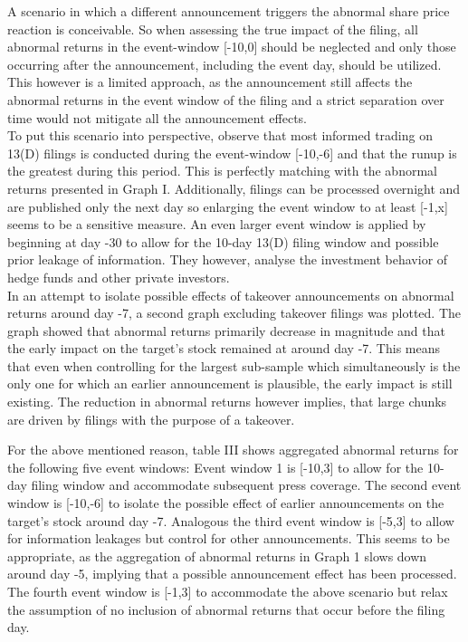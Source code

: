 \documentclass[12pt]{article}
\begin{document}
A scenario in which a different announcement triggers the abnormal share price reaction is conceivable. So when assessing the true impact of the filing, all abnormal returns in the event-window [-10,0] should be neglected and only those occurring after the announcement, including the event day, should be utilized. This however is a limited approach, as the announcement still affects the abnormal returns in the event window of the filing and a strict separation over time would not mitigate all the announcement effects.\\
To put this scenario into perspective, \citet[p.32]{Brigida2012} observe that most informed trading on 13(D) filings is conducted during the event-window [-10,-6] and that the runup is the greatest during this period. This is perfectly matching with the abnormal returns presented in Graph I. Additionally, filings can be processed overnight and are published only the next day so enlarging the event window to at least [-1,x] seems to be a sensitive measure. An even larger event window is applied by \citet[207]{Klein2009} beginning at day -30 to allow for the 10-day 13(D) filing window and possible prior leakage of information. They however, analyse the investment behavior of hedge funds and other private investors. \\
In an attempt to isolate possible effects of takeover announcements on abnormal returns around day -7, a second graph excluding takeover filings was plotted. The graph showed that abnormal returns primarily decrease in magnitude and that the early impact on the target's stock remained at around day -7. This means that even when controlling for the largest sub-sample which simultaneously is the only one for which an earlier announcement is plausible, the early impact is still existing. The reduction in abnormal returns however implies, that large chunks are driven by filings with the purpose of a takeover.

For the above mentioned reason, table III shows aggregated abnormal returns for the following five event windows: Event window 1 is [-10,3] to allow for the 10-day filing window and accommodate subsequent press coverage. The second event window is [-10,-6] to isolate the possible effect of earlier announcements on the target's stock around day -7. Analogous the third event window is [-5,3] to allow for information leakages but control for other announcements. This seems to be appropriate, as the aggregation of abnormal returns in Graph 1 slows down around day -5, implying that a possible announcement effect has been processed. The fourth event window is [-1,3] to accommodate the above scenario but relax the assumption of no inclusion of abnormal returns that occur before the filing day. 
\end{document}
